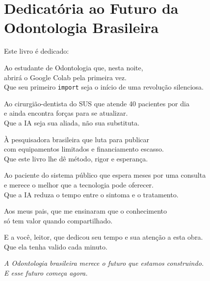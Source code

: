 \section{Dedicatória ao Futuro da Odontologia Brasileira}
\label{sec:dedicatoria-futuro}

\nivelzero

\begin{center}
\itshape

\bigskip

Este livro é dedicado:

\medskip

Ao estudante de Odontologia que, nesta noite, \\
abrirá o Google Colab pela primeira vez. \\
Que seu primeiro \texttt{import} seja o início de uma revolução silenciosa.

\medskip

Ao cirurgião-dentista do SUS que atende 40 pacientes por dia \\
e ainda encontra forças para se atualizar. \\
Que a IA seja sua aliada, não sua substituta.

\medskip

À pesquisadora brasileira que luta para publicar \\
com equipamentos limitados e financiamento escasso. \\
Que este livro lhe dê método, rigor e esperança.

\medskip

Ao paciente do sistema público que espera meses por uma consulta \\
e merece o melhor que a tecnologia pode oferecer. \\
Que a IA reduza o tempo entre o sintoma e o tratamento.

\medskip

Aos meus pais, que me ensinaram que o conhecimento \\
só tem valor quando compartilhado.

\medskip

E a você, leitor, que dedicou seu tempo e sua atenção a esta obra. \\
Que ela tenha valido cada minuto.

\bigskip

\textit{A Odontologia brasileira merece o futuro que estamos construindo.} \\
\textit{E esse futuro começa agora.}

\end{center}

